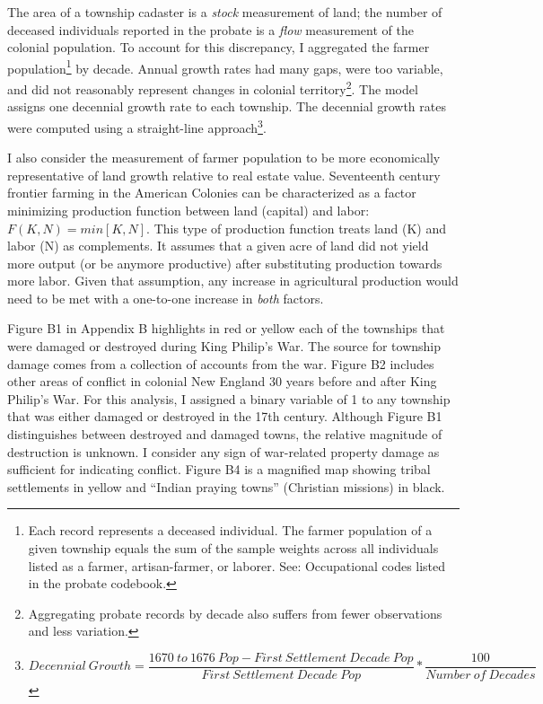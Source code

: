 \documentclass[sn-mathphys]{sn-jnl}%
\theoremstyle{thmstyleone}%
\theoremstyle{thmstyletwo}%
\theoremstyle{thmstylethree}%
\begin{document}
The area of a township cadaster is a {\em stock} measurement of land; the number of deceased individuals reported in the probate is a {\em flow} measurement of the colonial population. %
To account for this discrepancy, I aggregated the farmer population\footnote{Each record represents a deceased individual. The farmer population of a given township equals the sum of the sample weights across all individuals listed as a farmer, artisan-farmer, or laborer. See: Occupational codes listed in the probate codebook.} by decade.
Annual growth rates had many gaps, were too variable, and did not reasonably represent changes in colonial territory\footnote{Aggregating probate records by decade also suffers from fewer observations and less variation.}. The model assigns one decennial growth rate to each township. The decennial growth rates were computed using a straight-line approach\footnote{
$$
Decennial \ Growth=
\frac{ 1670 \ to \ 1676 \ Pop - First \ Settlement \ Decade \ Pop }{First \ Settlement \ Decade \ Pop} *
\frac{100}{Number \ of \ Decades}
$$}.

I also consider the measurement of farmer population to be more economically representative of land growth relative to real estate value. Seventeenth century frontier farming in the American Colonies can be characterized as a factor minimizing production function between land (capital) and labor: $F(K,N)=min[K,N]$. This type of production function treats land (K) and labor (N) as complements. It assumes that a given acre of land did not yield more output (or be anymore productive) after substituting production towards more labor. Given that assumption, any increase in agricultural production would need to be met with a one-to-one increase in {\em both} factors. 

Figure B1 in Appendix B highlights in red or yellow each of the townships that were damaged or destroyed during King Philip's War. The source for township damage comes from a collection of accounts from the war. Figure B2 includes other areas of conflict in colonial New England 30 years before and after King Philip's War. For this analysis, I assigned a binary variable of 1 to any township that was either damaged or destroyed in the 17th century. Although Figure B1 distinguishes between destroyed and damaged towns, the relative magnitude of destruction is unknown. I consider any sign of war-related property damage as sufficient for indicating conflict. Figure B4 is a magnified map showing tribal settlements in yellow and ``Indian praying towns'' (Christian missions) in black. 
\end{document}
